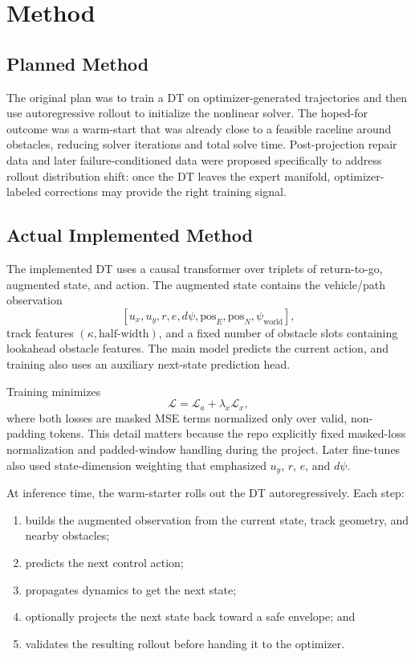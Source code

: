 \section{Method}

\subsection{Planned Method}

The original plan was to train a DT on optimizer-generated trajectories and then use autoregressive rollout to initialize the nonlinear solver. The hoped-for outcome was a warm-start that was already close to a feasible raceline around obstacles, reducing solver iterations and total solve time. Post-projection repair data and later failure-conditioned data were proposed specifically to address rollout distribution shift: once the DT leaves the expert manifold, optimizer-labeled corrections may provide the right training signal.

\subsection{Actual Implemented Method}

The implemented DT uses a causal transformer over triplets of return-to-go, augmented state, and action. The augmented state contains the vehicle/path observation
\[
[u_x, u_y, r, e, d\psi, \mathrm{pos}_E, \mathrm{pos}_N, \psi_{\mathrm{world}}],
\]
track features $(\kappa, \text{half-width})$, and a fixed number of obstacle slots containing lookahead obstacle features. The main model predicts the current action, and training also uses an auxiliary next-state prediction head.

Training minimizes
\[
\mathcal{L} = \mathcal{L}_{a} + \lambda_x \mathcal{L}_{x},
\]
where both losses are masked MSE terms normalized only over valid, non-padding tokens. This detail matters because the repo explicitly fixed masked-loss normalization and padded-window handling during the project. Later fine-tunes also used state-dimension weighting that emphasized $u_y$, $r$, $e$, and $d\psi$.

At inference time, the warm-starter rolls out the DT autoregressively. Each step:
\begin{enumerate}
\item builds the augmented observation from the current state, track geometry, and nearby obstacles;
\item predicts the next control action;
\item propagates dynamics to get the next state;
\item optionally projects the next state back toward a safe envelope; and
\item validates the resulting rollout before handing it to the optimizer.
\end{enumerate}

